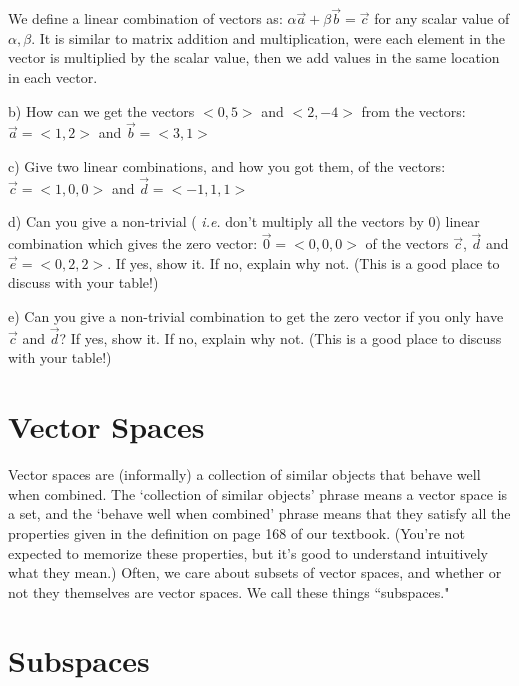 \documentclass{article}
\begin{document}
\begin{flushleft}
We define a linear combination of vectors as: $\alpha \vec{a} + \beta \vec{b} = \vec{c}$ for any scalar value of $\alpha, \beta$. It is similar to matrix addition and multiplication, were each element in the vector is multiplied by the scalar value, then we add values in the same location in each vector.

\vspace{0.1in}

b) How can we get the vectors $<0,5>$ and $<2,-4>$ from the vectors: $\vec{a}=<1,2>$ and $\vec{b}=<3,1>$

\vspace{1.25in}
 
c) Give two linear combinations, and how you got them, of the vectors: $\vec{c}=<1,0,0>$ and $\vec{d}=<-1,1,1>$

\vspace{1in}

d) Can you give a non-trivial (\emph{ i.e.} don't multiply all the vectors by 0) linear combination which gives the zero vector: $\vec{0}=<0,0,0>$ of the vectors $\vec{c}$, $\vec{d}$ and $\vec{e}=<0,2,2>$. If yes, show it. If no, explain why not. (This is a good place to discuss with your table!)

\vspace{1in}

e) Can you give a non-trivial combination to get the zero vector if you only have $\vec{c}$ and $\vec{d}$? If yes, show it. If no, explain why not. (This is a good place to discuss with your table!)

\vspace{1.5in}

\section*{Vector Spaces}

Vector spaces are (informally) a collection of similar objects that behave well when combined.  The `collection of similar objects' phrase means a vector space is a set, and the `behave well when combined' phrase means that they satisfy all the properties given in the definition on page 168 of our textbook.  (You're not expected to memorize these properties, but it's good to understand intuitively what they mean.)  Often, we care about subsets of vector spaces, and whether or not they themselves are vector spaces.  We call these things ``subspaces."

\section*{Subspaces}


\end{flushleft}
\end{document}
